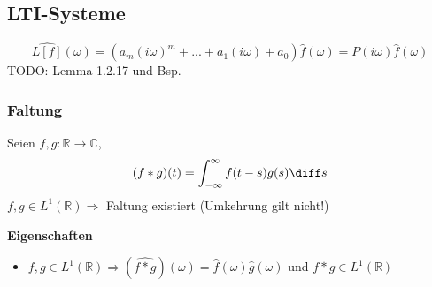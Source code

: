 \subsection{LTI-Systeme}
\begin{equation*}
    \widehat{L[f]}(\omega) = (a_m(i\omega)^m + ... + a_1(i\omega) + a_0)\hat f(\omega)=P(i\omega)\hat f(\omega)
\end{equation*}
TODO: Lemma 1.2.17 und Bsp.

\subsubsection{Faltung}
\begin{emphbox}
    Seien $f,g:\mathbb R \rightarrow \mathbb C$,
    \begin{equation*}
        (f*g)(t)=\int_{-\infty}^\infty f(t-s)g(s)\diff s
    \end{equation*}
    $f,g\in L^1(\mathbb R) \Rightarrow$ Faltung existiert (Umkehrung gilt nicht!)
\end{emphbox}

\begin{sectionbox}
    \textbf{Eigenschaften}
    \begin{itemize}
        \item $f,g\in L^1(\mathbb R) \Rightarrow (\widehat{f * g})(\omega)=\hat f(\omega)\hat g(\omega)$ und $f*g \in L^1(\mathbb R)$
    \end{itemize}
\end{sectionbox}